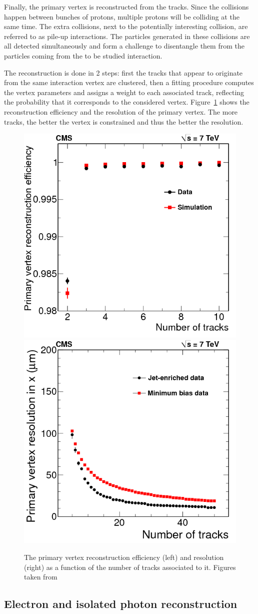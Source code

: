 Finally, the primary vertex is reconstructed from the tracks. Since the collisions happen between bunches of protons, multiple protons will be colliding at the same time. The extra collisions, next to the potentially interesting collision, are referred to as pile-up interactions. The particles generated in these collisions are all detected simultaneously and form a challenge to disentangle them from the particles coming from the to be studied interaction.

The reconstruction is done in 2 steps: first the tracks that appear to originate from the same interaction vertex are clustered, then a fitting procedure computes the vertex parameters and assigns a weight to each associated track, reflecting the probability that it corresponds to the considered vertex. Figure~\ref{fig:PV} shows the reconstruction efficiency and the resolution of the primary vertex. The more tracks, the better the vertex is constrained and thus the better the resolution.

\begin{figure}[ht]
  \centering
\includegraphics[width=.4\textwidth]{PV_eff}\hspace{1cm}
 \includegraphics[width=.4\textwidth]{PV_res} 
 \caption{The primary vertex reconstruction efficiency (left) and resolution (right) as a function of the number of tracks associated to it. Figures taken from~\cite{Chatrchyan:2014fea}}
 \label{fig:PV}
\end{figure}

\subsection{Electron and isolated photon reconstruction}
\label{sec:electron_reconstruction}


